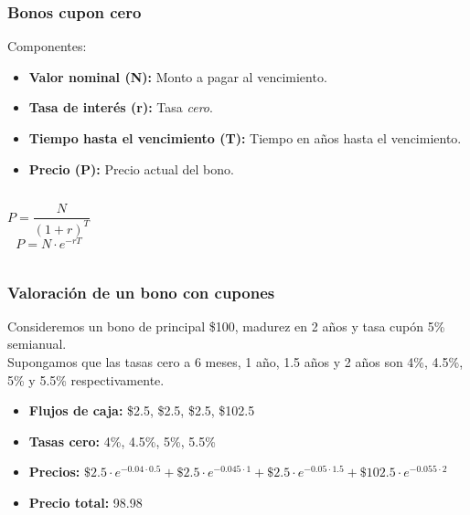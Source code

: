 
\begin{frame}
    \frametitle{Bonos cupon cero}
    Componentes:
    \begin{itemize}
        \item \textbf{Valor nominal (N):} Monto a pagar al vencimiento.
        \item \textbf{Tasa de interés (r):} Tasa \textit{cero}.
        \item \textbf{Tiempo hasta el vencimiento (T):} Tiempo en años hasta el vencimiento.
        \item \textbf{Precio (P):} Precio actual del bono.
    \end{itemize}
    \begin{columns}
            \begin{equation*}
                P = \frac{N}{(1+r)^T}
            \end{equation*}
            \begin{equation*}
                P = N \cdot e^{-rT}
            \end{equation*}
    \end{columns}
\end{frame}


\begin{frame}
    \frametitle{Valoración de un bono con cupones}
    Consideremos un bono de principal \$100, madurez en 2 años y tasa cupón 5\% semianual.\\
    Supongamos que las tasas cero a 6 meses, 1 año, 1.5 años y 2 años son 4\%, 4.5\%, 5\% y 5.5\% respectivamente.\\
    \begin{itemize}
        \item \textbf{Flujos de caja:} \$2.5, \$2.5, \$2.5, \$102.5
        \item \textbf{Tasas cero:} 4\%, 4.5\%, 5\%, 5.5\%
        \item \textbf{Precios:} $\$2.5 \cdot e^{-0.04 \cdot 0.5} + \$2.5 \cdot e^{-0.045 \cdot 1} + \$2.5 \cdot e^{-0.05 \cdot 1.5} + \$102.5 \cdot e^{-0.055 \cdot 2}$
        \item \textbf{Precio total:} 98.98
    \end{itemize}
\end{frame}

